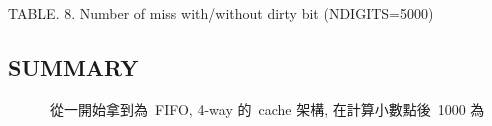 \documentclass{article}
\begin{document}
\begin{CJK*}{UTF8}{bsmi}
\begin{multicols}{2}
\begin{center}
    \footnotesize TABLE. 8. Number of miss with/without dirty bit  (NDIGITS=5000)
\end{center}

\columnbreak

\begin{center}
    \section*{SUMMARY}
\end{center}

\begin{flushleft}
    \ \ \ \ \ \ 從一開始拿到為\ FIFO, 4-way 的\ cache 架構, 在計算小數點後\ 1000 為
\end{flushleft}


\end{multicols}


\end{CJK*}
\end{document}
